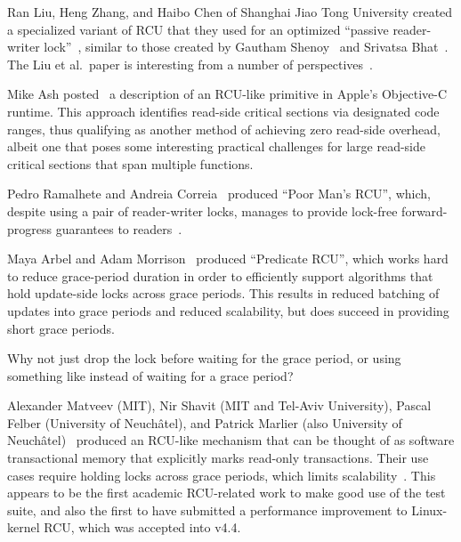 Ran Liu, Heng Zhang, and Haibo Chen of Shanghai Jiao Tong University
created a specialized variant of RCU that they used for an optimized
``passive reader-writer lock''~\cite{RanLiu2014PassiveRWLock}, similar to
those created by Gautham Shenoy~\cite{GauthamShenoy2006RCUrwlock} and
Srivatsa Bhat~\cite{SrivatsaSBhat2014RCUrwlock}.
The Liu et al.~paper is interesting from a number of
perspectives~\cite{PaulEMcKenney2014ReadMostly}.

Mike Ash posted~\cite{MikeAsh2015Apple} a description of an RCU-like
primitive in Apple's Objective-C runtime.
This approach identifies read-side critical sections via designated
code ranges, thus qualifying as another method of achieving
zero read-side overhead, albeit one that poses some interesting
practical challenges for large read-side critical sections that
span multiple functions.

Pedro Ramalhete and Andreia Correia~\cite{PedroRmalhete2015PoorMansRCU}
produced ``Poor Man's RCU'', which, despite using a pair of reader-writer
locks, manages to provide lock-free forward-progress guarantees to
readers~\cite{PaulEMcKenney2015ReadMostly}.

Maya Arbel and Adam Morrison~\cite{Arbel:2015:PRR:2858788.2688518}
produced ``Predicate RCU'', which works hard to reduce grace-period
duration in order to efficiently support algorithms that hold
update-side locks across grace periods.
This results in reduced batching of updates into grace periods
and reduced scalability, but does succeed in providing short
grace periods.

\QuickQuiz{}
	Why not just drop the lock before waiting for the grace
	period, or using something like 
	instead of waiting for a grace period?
 \QuickQuizEnd

Alexander Matveev (MIT), Nir Shavit (MIT and Tel-Aviv University),
Pascal Felber (University of Neuch\^{a}tel), and Patrick Marlier (also
University of Neuch\^{a}tel)~\cite{Matveev:2015:RLS:2815400.2815406}
produced an RCU-like mechanism that can be thought of as
software transactional memory that explicitly marks
read-only transactions.
Their use cases require holding locks across grace periods, which limits
scalability~\cite{PaulEMcKenney2015ReadMostly,PaulEMcKenney2015ReadMostlySidebar}.
This appears to be the first academic RCU-related work to
make good use of the  test suite, and also the
first to have submitted a performance improvement to Linux-kernel
RCU, which was accepted into v4.4.

